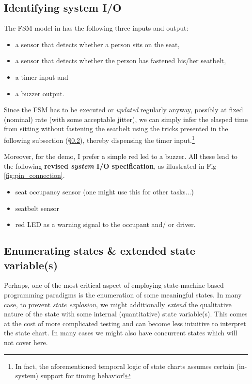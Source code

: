 \documentclass[12pt,a4paper]{scrartcl}
\begin{document}
	\subsection{Identifying system I/O} \label{sec:UML:IO}
		The FSM model in \cite{Wolf} has the following three inputs and output:
		{\color{gray} \small \itshape
		\begin{itemize}
			\item a sensor that detects whether a person sits on the seat,
			\item a sensor that detects whether the person has fastened his/her seatbelt,
			\item a timer input and
			\item a buzzer output.
		\end{itemize}}
		Since the FSM has to be executed or \textit{updated} regularly anyway, possibly at fixed (nominal) rate (with some acceptable jitter), we can simply infer the elasped time from sitting without fastening the seatbelt using the tricks presented in the following subsection 
		(\S \ref{sec:UML:list_states_n_counter_var}),
		thereby dispensing the timer input.\footnote{In fact, the aforementioned temporal logic of state charts assumes certain (in-system) support for timing behavior! }
	
		Moreover, for the demo, I prefer a simple red led to a buzzer. All these lead to the following \textbf{revised \textit{system} I/O specification}, as illustrated in Fig \ref{fig:pin_connection}.
		
		\begin{itemize}
			\item seat occupancy sensor (one might use this for other tasks...)
			\item seatbelt sensor
			\item red LED as a warning signal to the occupant and/ or driver.
		\end{itemize}

	\subsection{Enumerating states \& extended state variable(s)} \label{sec:UML:list_states_n_counter_var}
	Perhaps, one of the most critical aspect of employing state-machine based programming paradigms is the enumeration of some meaningful states. In many case, to prevent \textit{state explosion}, we might additionally \textit{extend} the qualitative nature of the state with some internal (quantitative) state variable(s). This comes at the cost of more complicated testing and can become less intuitive to interpret the state chart. 
	In many cases we might also have concurrent states which will not cover here.
	
\end{document}
